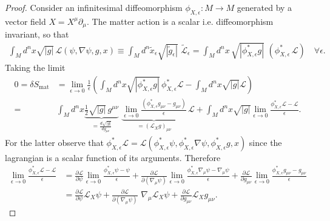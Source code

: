 \begin{proof}
%
Consider an infinitesimal diffeomorphism $\phi_{X,\epsilon}:M\to M$  generated by a vector field $X=X^\mu \partial_\mu$.
The matter action is a scalar i.e. diffeomorphism invariant, so that 
\begin{align}
    \int_M d^nx\sqrt{|g|}\,\mathcal{L}(\psi,\nabla\psi,g,x) \equiv \int_M \!\!\!d^n\tilde{x}_\epsilon\sqrt{|\tilde{g}_\epsilon|}\,\,\tilde{\mathcal{L}}_\epsilon 
    = \int_M \!\!\!d^nx\,\sqrt{|\phi_{X,\epsilon}^* g|}\,\,\left( \phi_{X,\epsilon}^*\, \mathcal{L}\right)
    \quad \forall \epsilon.
\end{align}
Taking the limit
\begin{align}
    0 = \delta S_\text{mat} &= \lim_{\epsilon\to 0} \frac{1}{\epsilon} \left( \int_M \!\!\!d^nx\sqrt{|\phi_{X,\epsilon}^* g|}\, \phi_{X,\epsilon}^* \mathcal{L} - \int_M \!\!\!d^nx\sqrt{|g|}\mathcal{L} \right)
    \\
    =& \int_M \!\!d^nx \underbrace{\tfrac{1}{2}\sqrt{|g|}\, g^{\mu\nu}}_{=\frac{d\sqrt{|g|}}{d g_{\mu\nu}}}\,\,\underbrace{\lim_{\epsilon\to 0}\frac{(\phi_{X,\epsilon}^*g_{\mu\nu}-g_{\mu\nu})}{\epsilon}}_{=(\mathcal{L}_Xg)_{\mu\nu}}\,\mathcal{L}
    + \int_M\!\! d^nx \sqrt{|g|} \lim_{\epsilon\to 0} \frac{\phi_{X,\epsilon}^* \mathcal{L} - \mathcal{L}}{\epsilon}.
\end{align}
For the latter observe that $\phi_{X,\epsilon}^* \mathcal{L} = \mathcal{L}(\phi_{X,\epsilon}^* \psi,\phi_{X,\epsilon}^* \nabla \psi, \phi_{X,\epsilon}^* g, x)$ since the lagrangian is a scalar function of its arguments.
Therefore 
\begin{align}
    \lim_{\epsilon\to 0} \frac{\phi_{X,\epsilon}^* \mathcal{L} - \mathcal{L}}{\epsilon} 
    &= \frac{\partial \mathcal{L}}{\partial \psi} \lim_{\epsilon\to 0} \frac{\phi_{X,\epsilon}^* \psi - \psi}{\epsilon}
    + \frac{\partial \mathcal{L}}{\partial (\nabla_\mu \psi)} \lim_{\epsilon\to 0} \frac{\phi_{X,\epsilon}^* \nabla_\mu\psi - \nabla_\mu \psi}{\epsilon}
    + \frac{\partial \mathcal{L}}{\partial g_{\mu\nu}} \lim_{\epsilon\to 0} \frac{\phi_{X,\epsilon}^* g_{\mu\nu}-g_{\mu\nu}}{\epsilon}
    \\
    &= \frac{\partial \mathcal{L}}{\partial \psi} \mathcal{L}_X \psi + \frac{\partial \mathcal{L}}{\partial (\nabla_\mu \psi)} \,\,\nabla_\mu\mathcal{L}_X \psi + \frac{\partial \mathcal{L}}{\partial g_{\mu\nu}} \mathcal{L}_X g_{\mu\nu}.
\end{align}


\end{proof}
